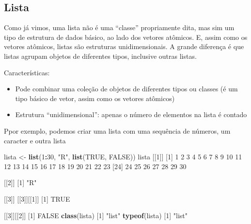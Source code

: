 \documentclass[10pt,a4paper]{book}
\newenvironment{Shaded}{\begin{snugshade}}{\end{snugshade}}
\newcommand{\KeywordTok}[1]{\textcolor[rgb]{0.13,0.29,0.53}{\textbf{#1}}}
\newcommand{\DecValTok}[1]{\textcolor[rgb]{0.00,0.00,0.81}{#1}}
\newcommand{\StringTok}[1]{\textcolor[rgb]{0.31,0.60,0.02}{#1}}
\newcommand{\OtherTok}[1]{\textcolor[rgb]{0.56,0.35,0.01}{#1}}
\newcommand{\OperatorTok}[1]{\textcolor[rgb]{0.81,0.36,0.00}{\textbf{#1}}}
\newcommand{\NormalTok}[1]{#1}
\providecommand{\tightlist}{%
  \setlength{\itemsep}{0pt}\setlength{\parskip}{0pt}}
\begin{document}
\subsection{Lista}\label{lista}

Como já vimos, uma lista não é uma ``classe'' propriamente dita, mas sim
um tipo de estrutura de dados básico, ao lado dos vetores atômicos. E,
assim como os vetores atômicos, listas são estruturas unidimensionais. A
grande diferença é que listas agrupam objetos de diferentes tipos,
inclusive outras listas.

Características:

\begin{itemize}
\tightlist
\item
  Pode combinar uma coleção de objetos de diferentes tipos ou classes (é
  um tipo básico de vetor, assim como os vetores atômicos)
\item
  Estrutura ``unidimensional'': apenas o número de elementos na lista é
  contado
\end{itemize}

Ppor exemplo, podemos criar uma lista com uma sequência de números, um
caracter e outra lista

\begin{Shaded}
\begin{Highlighting}[]
\NormalTok{lista <-}\StringTok{ }\KeywordTok{list}\NormalTok{(}\DecValTok{1}\OperatorTok{:}\DecValTok{30}\NormalTok{, }\StringTok{"R"}\NormalTok{, }\KeywordTok{list}\NormalTok{(}\OtherTok{TRUE}\NormalTok{, }\OtherTok{FALSE}\NormalTok{))}
\NormalTok{lista}
\NormalTok{[[}\DecValTok{1}\NormalTok{]]}
\NormalTok{ [}\DecValTok{1}\NormalTok{]  }\DecValTok{1}  \DecValTok{2}  \DecValTok{3}  \DecValTok{4}  \DecValTok{5}  \DecValTok{6}  \DecValTok{7}  \DecValTok{8}  \DecValTok{9} \DecValTok{10} \DecValTok{11} \DecValTok{12} \DecValTok{13} \DecValTok{14} \DecValTok{15} \DecValTok{16} \DecValTok{17} \DecValTok{18} \DecValTok{19} \DecValTok{20} \DecValTok{21} \DecValTok{22} \DecValTok{23}
\NormalTok{[}\DecValTok{24}\NormalTok{] }\DecValTok{24} \DecValTok{25} \DecValTok{26} \DecValTok{27} \DecValTok{28} \DecValTok{29} \DecValTok{30}

\NormalTok{[[}\DecValTok{2}\NormalTok{]]}
\NormalTok{[}\DecValTok{1}\NormalTok{] }\StringTok{"R"}

\NormalTok{[[}\DecValTok{3}\NormalTok{]]}
\NormalTok{[[}\DecValTok{3}\NormalTok{]][[}\DecValTok{1}\NormalTok{]]}
\NormalTok{[}\DecValTok{1}\NormalTok{] }\OtherTok{TRUE}

\NormalTok{[[}\DecValTok{3}\NormalTok{]][[}\DecValTok{2}\NormalTok{]]}
\NormalTok{[}\DecValTok{1}\NormalTok{] }\OtherTok{FALSE}
\KeywordTok{class}\NormalTok{(lista)}
\NormalTok{[}\DecValTok{1}\NormalTok{] }\StringTok{"list"}
\KeywordTok{typeof}\NormalTok{(lista)}
\NormalTok{[}\DecValTok{1}\NormalTok{] }\StringTok{"list"}
\end{Highlighting}
\end{Shaded}
\end{document}
